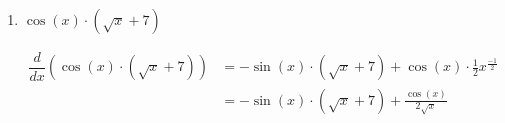\documentclass{ximera}
\begin{document}
\begin{problem}
\begin{enumerate}
\begin{explanation}
\begin{align*}
		\end{align*}
		\end{explanation}
\item  $\cos(x) \cdot\left( \sqrt{x} + 7 \right) $
		\begin{explanation}
		\begin{align*}
		\dfrac{d}{dx}\left(\cos(x)\cdot \left( \sqrt{x} + 7 \right) \right) &= - \sin(x)\cdot \left( \sqrt{x} + 7 \right)+\cos(x)\cdot\frac{1}{2} x^{\frac{-1}{2}} \\
		&= - \sin(x)\cdot \left( \sqrt{x} + 7 \right)+\frac{\cos(x)}{2\sqrt{x}}
		\end{align*}
		\end{explanation}
\end{enumerate}
		
		
		
		
\end{problem}
\end{document}
